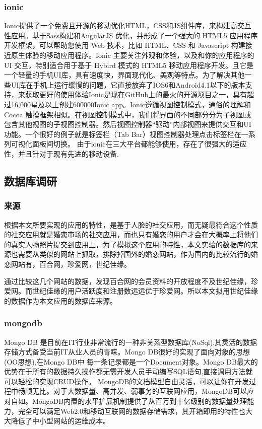 \subsubsection{ionic}
Ionic提供了一个免费且开源的移动优化HTML，CSS和JS组件库，来构建高交互性应用。基于Sass构建和AngularJS 优化，并形成了一个强大的 HTML5 应用程序开发框架，可以帮助您使用 Web 技术，比如 HTML、CSS 和 Javascript 构建接近原生体验的移动应用程序。Ionic 主要关注外观和体验，以及和你的应用程序的 UI 交互，特别适合用于基于 Hybird 模式的 HTML5 移动应用程序开发。且它是一个轻量的手机UI库，具有速度快，界面现代化、美观等特点。为了解决其他一些UI库在手机上运行缓慢的问题，它直接放弃了IOS6和Android4.1以下的版本支持，来获取更好的使用体验Ionic是现在GitHub上的最火的开源项目之一，具有超过16,000星及以上创建600000Ionic app。Ionic遵循视图控制模式，通俗的理解和 Cocoa 触摸框架相似。在视图控制模式中，我们将界面的不同部分分为子视图或包含其他视图的子视图控制器。然后视图控制器“驱动”内部视图来提供交互和UI功能。一个很好的例子就是标签栏（Tab Bar）视图控制器处理点击标签栏在一系列可视化面板间切换。
由于ionic在三大平台都能够使用，存在了很强大的适应性，并且针对于现有先进的移动设备.

\subsection{数据库调研}
\subsubsection{来源}
根据本文所要实现的应用的特性，是基于人脸的社交应用，而无疑最符合这个性质的社交应用就是婚恋市场的社交应用，而也只有婚恋的用户才会在大概率上将他们的真实人物照片提交到应用上，为了模拟这个应用的特性，本文实验的数据库的来源也需要从类似的网站上抓取，排除掉国外的婚恋网站，作为国内的比较流行的婚恋网站有，百合网，珍爱网，世纪佳缘。

通过比较这几个网站的数据，发现百合网的会员资料的开放程度不及世纪佳缘，珍爱网。而世纪佳缘的用户活跃度和注册数远远优于珍爱网。所以本文拟用世纪佳缘的数据作为本文应用的数据库来源。
\subsubsection{mongodb}
Mongo DB 是目前在IT行业非常流行的一种非关系型数据库(NoSql),其灵活的数据存储方式备受当前IT从业人员的青睐。Mongo DB很好的实现了面向对象的思想(OO思想),在Mongo DB中 每一条记录都是一个Document对象。Mongo DB最大的优势在于所有的数据持久操作都无需开发人员手动编写SQL语句,直接调用方法就可以轻松的实现CRUD操作。
MongoDB的文档模型自由灵活，可以让你在开发过程中畅顺无比。对于大数据量、高并发、弱事务的互联网应用，MongoDB可以应对自如。MongoDB内置的水平扩展机制提供了从百万到十亿级别的数据量处理能力，完全可以满足Web2.0和移动互联网的数据存储需求，其开箱即用的特性也大大降低了中小型网站的运维成本。



